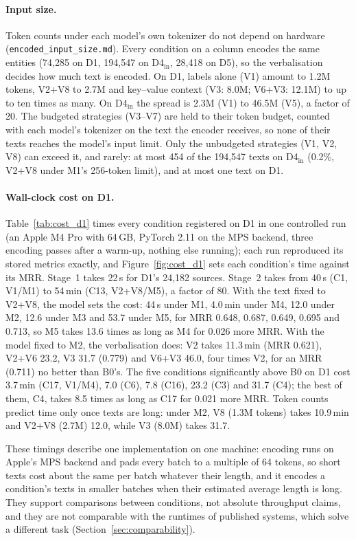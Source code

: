 \paragraph{Input size.}
Token counts under each model's own tokenizer do not depend on hardware
(\texttt{encoded\_input\_size.md}). Every condition on a column encodes the
same entities (74,285 on D1, 194,547 on D4$_{\mathrm{in}}$, 28,418 on D5), so
the verbalisation decides how much text is encoded. On D1, labels alone (V1) amount
to 1.2M tokens, V2+V8 to 2.7M and key--value context (V3: 8.0M; V6+V3: 12.1M)
to up to ten times as many. On D4$_{\mathrm{in}}$ the spread is 2.3M (V1) to
46.5M (V5), a factor of 20. The budgeted strategies (V3--V7) are held to
their token budget, counted with each model's tokenizer on the text the
encoder receives, so none of their texts reaches the model's input limit.
Only the unbudgeted strategies (V1, V2, V8) can exceed it, and rarely: at
most 454 of the 194,547 texts on D4$_{\mathrm{in}}$ (0.2\%, V2+V8 under
M1's 256-token limit), and at most one text on D1.

\paragraph{Wall-clock cost on D1.}
Table~\ref{tab:cost_d1} times every condition registered on D1 in one
controlled run (an Apple M4 Pro with 64\,GB, PyTorch 2.11 on the MPS backend,
three encoding passes after a warm-up, nothing else running); each run
reproduced its stored metrics exactly, and Figure~\ref{fig:cost_d1} sets each
condition's time against its MRR. Stage~1 takes 22\,s for D1's 24,182
sources. Stage~2 takes from 40\,s (C1, V1/M1) to 54\,min (C13, V2+V8/M5), a
factor of 80. With the text fixed to V2+V8, the model sets the cost: 44\,s
under M1, 4.0\,min under M4, 12.0 under M2, 12.6 under M3 and 53.7 under M5,
for MRR 0.648, 0.687, 0.649, 0.695 and 0.713, so M5 takes 13.6 times as long
as M4 for 0.026 more MRR. With the model fixed to M2, the verbalisation does:
V2 takes 11.3\,min (MRR 0.621), V2+V6 23.2, V3 31.7 (0.779) and V6+V3 46.0,
four times V2, for an MRR (0.711) no better than B0's. The five conditions
significantly above B0 on D1 cost 3.7\,min (C17, V1/M4), 7.0 (C6), 7.8 (C16),
23.2 (C3) and 31.7 (C4); the best of them, C4, takes 8.5 times as long as
C17 for 0.021 more MRR. Token counts predict time only once texts are long:
under M2, V8 (1.3M tokens) takes 10.9\,min and V2+V8 (2.7M) 12.0, while V3
(8.0M) takes 31.7.

These timings describe one implementation on one machine: encoding runs on
Apple's MPS backend and pads every batch to a multiple of 64 tokens, so short
texts cost about the same per batch whatever their length, and it encodes a
condition's texts in smaller batches when their estimated average length is
long. They support comparisons between conditions, not absolute
throughput claims, and they are not comparable with the runtimes of published
systems, which solve a different task (Section~\ref{sec:comparability}).

